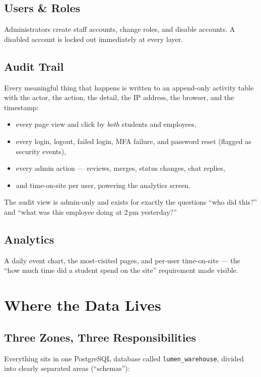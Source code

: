 \documentclass[11pt,letterpaper]{report}
\begin{document}
\section{Users \& Roles}

Administrators create staff accounts, change roles, and disable accounts. A
disabled account is locked out immediately at every layer.

\section{Audit Trail}

Every meaningful thing that happens is written to an append-only activity table
with the actor, the action, the detail, the IP address, the browser, and the
timestamp:

\begin{itemize}[leftmargin=1.4em]
  \item every page view and click by \emph{both} students and employees,
  \item every login, logout, failed login, MFA failure, and password reset
        (flagged as security events),
  \item every admin action --- reviews, merges, status changes, chat replies,
  \item and time-on-site per user, powering the analytics screen.
\end{itemize}

The audit view is admin-only and exists for exactly the questions ``who did
this?'' and ``what was this employee doing at 2\,pm yesterday?''

\section{Analytics}

A daily event chart, the most-visited pages, and per-user time-on-site --- the
``how much time did a student spend on the site'' requirement made visible.

\chapter{Where the Data Lives}

\section{Three Zones, Three Responsibilities}

Everything sits in one PostgreSQL database called \texttt{lumen\_warehouse},
divided into clearly separated areas (``schemas''):
\end{document}
